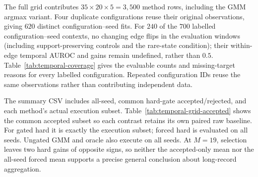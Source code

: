 \documentclass[11pt]{article}
\begin{document}
\begin{table}[!htbp]
\centering
\caption{Selected-cell exact group-size-matched random control. Intervals resample
the twenty seeds, after averaging partition AUROCs within each seed. The $616$
partitions are not independent replications.}
\label{tab:matched-grouping}

\end{table}

The full grid contributes $35\times20\times5=3{,}500$ method rows, including the
GMM argmax variant. Four duplicate configurations reuse their original
observations, giving $620$ distinct configuration--seed fits. For $240$ of the
$700$ labelled configuration--seed contexts, no changing edge flips in the
evaluation windows (including support-preserving controls and the rare-state
condition); their within-edge temporal AUROC and gains remain undefined, rather than $0.5$.
Table~\ref{tab:temporal-coverage} gives the evaluable counts and missing-target
reasons for every labelled configuration. Repeated configuration IDs reuse
the same observations rather than contributing independent data.

The summary CSV includes all-seed, common hard-gate accepted/rejected, and each
method's actual execution subset. Table~\ref{tab:temporal-grid-accepted} shows the
common accepted subset so each contrast retains its own paired raw baseline.
For gated hard it is exactly the execution subset; forced hard is
evaluated on all seeds. Ungated GMM and oracle also execute on all seeds.
At $M=19$, selection leaves two hard
gains of opposite signs, so neither the accepted-only mean nor the all-seed
forced mean supports a precise general conclusion about long-record aggregation.

\begin{table}[!htbp]
\centering
\caption{Paired gains on the common hard-gate accepted subset. $n$ is the number
of evaluable accepted seeds; Raw is their own absolute within-edge temporal AUROC. Intervals
are pointwise paired-seed bootstrap intervals; [--] means fewer than five seeds,
not a missing mean. GMM and oracle remain ungated comparators.}
\label{tab:temporal-grid-accepted}
\resizebox{\linewidth}{!}{}
\end{table}
\end{document}
